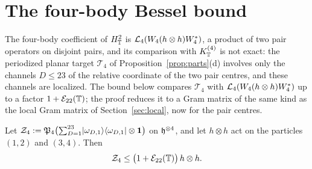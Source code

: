 \section{The four-body Bessel bound}\label{sec:bessel}

The four-body coefficient of $H_{\mathbb{T}}^2$ is $\mathcal{L}_4(W_4(h\otimes h)W_4^*)$, a product of two pair operators on disjoint pairs, and its
comparison with $K_{\mathbb{T}}^{(4)}$ is not exact: the periodized planar target $\mathcal T_4$ of Proposition~\ref{prop:parts}(d) involves only
the channels $D\le23$ of the relative coordinate of the two pair centres, and these channels are localized. The bound below
compares $\mathcal T_4$ with $\mathcal{L}_4(W_4(h\otimes h)W_4^*)$ up to a factor $1+\mathcal{E}_{22}(\mathbb{T})$; the proof reduces it to a Gram matrix of
the same kind as the local Gram matrix of Section~\ref{sec:local}, now for the pair centres.

\begin{lemma}\label{lem:bessel}
Let $\mathcal Z_4:=\mathfrak{P}_4\bigl(\sum_{D=1}^{23}\lvert \omega_{D,1}\rangle\langle \omega_{D,1}\rvert\otimes\mathbf{1}\bigr)$ on $\mathfrak{h}^{\otimes4}$, and let $h\otimes h$ act on the
particles $(1,2)$ and $(3,4)$. Then
\[
\mathcal Z_4\le\bigl(1+\mathcal{E}_{22}(\mathbb{T})\bigr)\,h\otimes h .
\]
\end{lemma}

